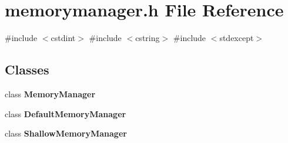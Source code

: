 \section{memorymanager.\+h File Reference}
\label{memorymanager_8h}
{\ttfamily \#include $<$cstdint$>$}\newline
{\ttfamily \#include $<$cstring$>$}\newline
{\ttfamily \#include $<$stdexcept$>$}\newline
\subsection*{Classes}
\begin{DoxyCompactItemize}
\item 
class \textbf{ Memory\+Manager}
\item 
class \textbf{ Default\+Memory\+Manager}
\item 
class \textbf{ Shallow\+Memory\+Manager}
\end{DoxyCompactItemize}
